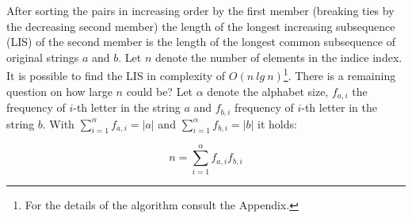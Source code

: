 \documentclass[times, utf8, diplomski]{fer}
\begin{document}
\begin{table}[H]
  \centering
  \centering
  \caption{Longest increasing subsequence (LCS) setup}\label{lcs.indices}
\end{table}

After sorting the pairs in increasing order by the first member (breaking ties by the decreasing second member) the length of the longest increasing subsequence (LIS) of the second member is the length of the longest common subsequence of original strings $a$ and $b$. Let $n$ denote the number of elements in the indice index. It is possible to find the LIS in complexity of $O(n\ lg\ n)$\footnote{For the details of the algorithm consult the Appendix.}. There is a remaining question on how large $n$ could be? Let $\alpha$ denote the alphabet size, $f_{a,i}$ the frequency of $i$-th letter in the string $a$ and $f_{b,i}$ frequency of $i$-th letter in the string $b$. With $\sum\limits_{i=1}^{\alpha}f_{a,i}=|a|$ and $\sum\limits_{i=1}^{\alpha}f_{b,i}=|b|$ it holds:

\begin{equation}
	n = \sum\limits_{i=1}^{\alpha}f_{a,i}f_{b,i}
\end{equation}
\end{document}
